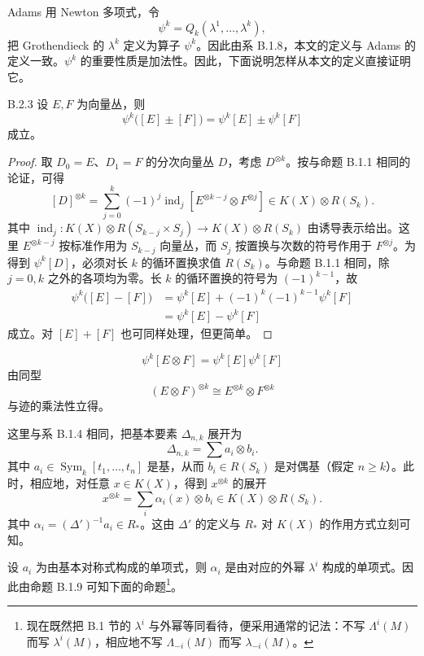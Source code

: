 Adams 用 Newton 多项式，令
\[
\psi^k=Q_k(\lambda^1,\dots,\lambda^k),
\]
把 Grothendieck 的 $\lambda^k$ 定义为算子 $\psi^k$。因此由系 B.1.8，本文的定义与 Adams 的定义一致。$\psi^k$ 的重要性质是加法性。因此，下面说明怎样从本文的定义直接证明它。


\begin{proposition*}{B.2.3}
  设 $E,F$ 为向量丛，则
  \[
  \psi^k\bigl([E]\pm[F]\bigr)=\psi^k[E]\pm\psi^k[F]
  \]
  成立。
\end{proposition*}

\begin{proof}
  取 $D_0=E$、$D_1=F$ 的分次向量丛 $D$，考虑 $D^{\otimes k}$。按与命题 B.1.1 相同的论证，可得
  \[
  [D]^{\otimes k}=\sum_{j=0}^{k}(-1)^j\operatorname{ind}_j[E^{\otimes k-j}\otimes F^{\otimes j}]\in K(X)\otimes R(S_k).
  \]
  其中 $\operatorname{ind}_j\colon K(X)\otimes R(S_{k-j}\times S_j)\to K(X)\otimes R(S_k)$ 由诱导表示给出。这里 $E^{\otimes k-j}$ 按标准作用为 $S_{k-j}$ 向量丛，而 $S_j$ 按置换与次数的符号作用于 $F^{\otimes j}$。为得到 $\psi^k[D]$，必须对长 $k$ 的循环置换求值 $R(S_k)$。与命题 B.1.1 相同，除 $j=0,k$ 之外的各项均为零。长 $k$ 的循环置换的符号为 $(-1)^{k-1}$，故
  \begin{align*}
  \psi^k\bigl([E]-[F]\bigr)&=\psi^k[E]+(-1)^k(-1)^{k-1}\psi^k[F]\\
  &=\psi^k[E]-\psi^k[F]
  \end{align*}
  成立。对 $[E]+[F]$ 也可同样处理，但更简单。
\end{proof}


\[
\psi^k[E\otimes F]=\psi^k[E]\psi^k[F]
\]
由同型
\[
(E\otimes F)^{\otimes k}\cong E^{\otimes k}\otimes F^{\otimes k}
\]
与迹的乘法性立得。

这里与系 B.1.4 相同，把基本要素 $\Delta_{n,k}$ 展开为
\[
\Delta_{n,k}=\sum a_i\otimes b_i.
\]
其中 $a_i\in\operatorname{Sym}_k[t_1,\dots,t_n]$ 是基，从而 $b_i\in R(S_k)$ 是对偶基（假定 $n\ge k$）。此时，相应地，对任意 $x\in K(X)$，得到 $x^{\otimes k}$ 的展开
\[
x^{\otimes k}=\sum_i\alpha_i(x)\otimes b_i\in K(X)\otimes R(S_k).
\]
其中 $\alpha_i=(\Delta')^{-1}a_i\in R_*$。这由 $\Delta'$ 的定义与 $R_*$ 对 $K(X)$ 的作用方式立刻可知。

设 $a_i$ 为由基本对称式构成的单项式，则 $\alpha_i$ 是由对应的外幂 $\lambda^i$ 构成的单项式。因此由命题 B.1.9 可知下面的命题\footnote{现在既然把 B.1 节的 $\lambda^i$ 与外幂等同看待，便采用通常的记法：不写 $\Lambda^i(M)$ 而写 $\lambda^i(M)$，相应地不写 $\Lambda_{-i}(M)$ 而写 $\lambda_{-i}(M)$。}。

